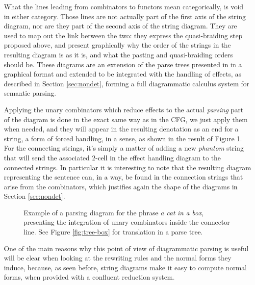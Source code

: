 \medskip

What the lines leading from combinators to functors mean categorically, is
void in either category.
Those lines are not actually part of the first axis of the string diagram,
nor are they part of the second axis of the string diagram.
They are used to map out the link between the two: they express the
quasi-braiding step proposed above, and present graphically why the order of
the strings in the resulting diagram is as it is, and what the pasting and
quasi-braiding orders should be.
These diagrams are an extension of the parse trees presented in
\cite{bumfordEffectdrivenInterpretationFunctors2025} in a graphical format and
extended to be integrated with the handling of effects, as described in Section
\ref{sec:nondet}, forming a full diagrammatic calculus system for semantic
parsing.

\medskip

Applying the unary combinators which reduce effects to the actual
\emph{parsing} part of the diagram is done in the exact same way as in the CFG,
we just apply them when needed, and they will appear in the resulting
denotation as an end for a string, a form of forced handling, in a sense, as
shown in the result of Figure \ref{fig:parsing-diagram2}.
For the connecting strings, it's simply a matter of adding a new \emph{phantom}
string that will send the associated $2$-cell in the effect handling diagram to
the connected strings.
In particular it is interesting to note that the resulting diagram representing
the sentence can, in a way, be found in the connection strings that arise from
the combinators, which justifies again the shape of the diagrams in Section
\ref{sec:nondet}.

\begin{figure}
	\centering
	\caption{Example of a parsing diagram for the phrase
		\emph{a cat in a box}, presenting the integration of unary combinators
		inside the connector line.
		See Figure \ref{fig:tree-box} for translation in a parse tree.}
	\label{fig:parsing-diagram2}
\end{figure}

One of the main reasons why this point of view of diagrammatic parsing is
useful will be clear when looking at the rewriting rules and the normal forms
they induce, because, as seen before, string diagrams make it easy to compute
normal forms, when provided with a confluent reduction system.

